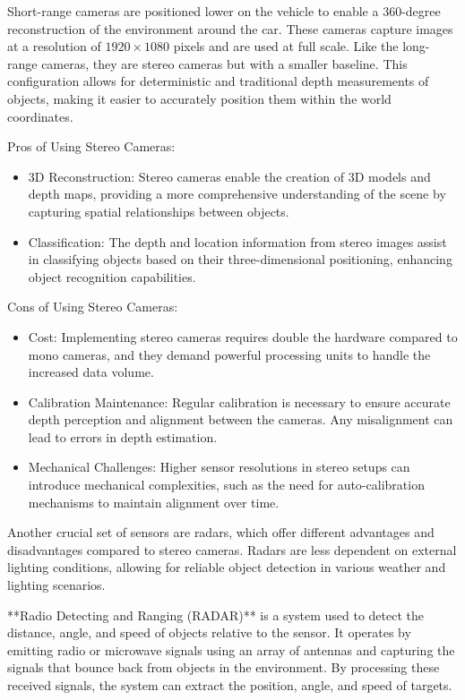 Short-range cameras are positioned lower on the vehicle to enable a 360-degree reconstruction of the environment around the car. These cameras capture images at a resolution of $1920 \times 1080$ pixels and are used at full scale. Like the long-range cameras, they are stereo cameras but with a smaller baseline. This configuration allows for deterministic and traditional depth measurements of objects, making it easier to accurately position them within the world coordinates.

Pros of Using Stereo Cameras:
\begin{itemize}
    \item 3D Reconstruction: Stereo cameras enable the creation of 3D models and depth maps, providing a more comprehensive understanding of the scene by capturing spatial relationships between objects.
    \item Classification: The depth and location information from stereo images assist in classifying objects based on their three-dimensional positioning, enhancing object recognition capabilities.
\end{itemize}

Cons of Using Stereo Cameras:
\begin{itemize}
    \item Cost: Implementing stereo cameras requires double the hardware compared to mono cameras, and they demand powerful processing units to handle the increased data volume.
    \item Calibration Maintenance: Regular calibration is necessary to ensure accurate depth perception and alignment between the cameras. Any misalignment can lead to errors in depth estimation.
    \item Mechanical Challenges: Higher sensor resolutions in stereo setups can introduce mechanical complexities, such as the need for auto-calibration mechanisms to maintain alignment over time.
\end{itemize}

Another crucial set of sensors are radars, which offer different advantages and disadvantages compared to stereo cameras. Radars are less dependent on external lighting conditions, allowing for reliable object detection in various weather and lighting scenarios.

**Radio Detecting and Ranging (RADAR)** is a system used to detect the distance, angle, and speed of objects relative to the sensor. It operates by emitting radio or microwave signals using an array of antennas and capturing the signals that bounce back from objects in the environment. By processing these received signals, the system can extract the position, angle, and speed of targets.

